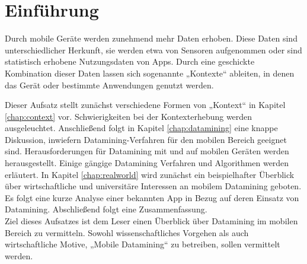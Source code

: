 \chapter{Einführung}

Durch mobile Geräte werden zunehmend mehr Daten erhoben. Diese Daten sind unterschiedlicher Herkunft, sie werden etwa von Sensoren aufgenommen oder sind statistisch erhobene Nutzungsdaten von Apps. Durch eine geschickte Kombination dieser Daten lassen sich sogenannte „Kontexte“ ableiten, in denen das Gerät oder bestimmte Anwendungen genutzt werden.

Dieser Aufsatz stellt zunächst verschiedene Formen von „Kontext“ in Kapitel \ref{chap:context} vor. Schwierigkeiten bei der Kontexterhebung werden ausgeleuchtet. Anschließend folgt in Kapitel \ref{chap:datamining} eine knappe Diskussion, inwiefern Datamining-Verfahren für den mobilen Bereich geeignet sind.  Herausforderungen für Datamining mit und auf mobilen Geräten werden herausgestellt. Einige gängige Datamining Verfahren und Algorithmen werden erläutert. In Kapitel \ref{chap:realworld} wird zunächst ein beispielhafter Überblick über wirtschaftliche und universitäre Interessen an mobilem Datamining geboten. Es folgt eine kurze Analyse einer bekannten App in Bezug auf deren Einsatz von Datamining. Abschließend folgt eine Zusammenfassung. \\

Ziel dieses Aufsatzes ist dem Leser einen Überblick über Datamining im mobilen Bereich zu vermitteln. Sowohl wissenschaftliches Vorgehen als auch wirtschaftliche Motive, „Mobile Datamining“ zu betreiben, sollen vermittelt werden.

\nocite{*}